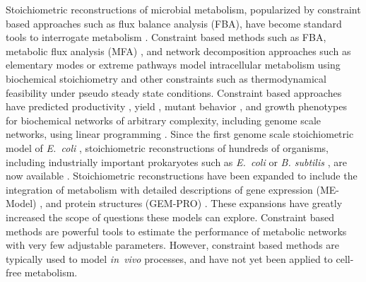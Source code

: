 \documentclass[journal=asbcd6,manuscript=article]{achemso}
\begin{document}
Stoichiometric reconstructions of microbial metabolism, popularized by constraint based approaches such as flux balance analysis (FBA), have become standard tools to interrogate metabolism \cite{2012_lewis_palsson_NatRevMicrobio}.
Constraint based methods such as FBA, metabolic flux analysis (MFA) \cite{WIECHERT2001195}, and network decomposition approaches such as elementary modes \cite{Schuster:2000aa} or extreme pathways \cite{Schilling:2000aa} model intracellular metabolism using biochemical stoichiometry and other constraints such as thermodynamical feasibility \cite{Henry:2007,Hamilton:2013} under pseudo steady state conditions.
Constraint based approaches have predicted productivity \cite{Varma01101994, BTPR:BTPR2132}, yield \cite{Varma01101994}, mutant behavior \cite{Edwards2000}, and growth phenotypes \cite{Brien693} for biochemical networks of arbitrary complexity, including genome scale networks, using linear programming \cite{Covert:2004aa}.
Since the first genome scale stoichiometric model of \textit{E.~coli} \cite{2000_edwards_palsson_PNAS}, stoichiometric reconstructions of hundreds of organisms, including industrially important prokaryotes such as \textit{E.~coli} \cite{Feist:2007aa} or \textit{B. subtilis} \cite{Oh:2007aa}, are now available \cite{2009_feist_palsson_NatRevMicrobio}.
Stoichiometric reconstructions have been expanded to include the integration of metabolism with detailed descriptions of gene expression (ME-Model) \cite{Allen:2003aa, Brien693},
and protein structures (GEM-PRO) \cite{Zhang1544,Chang1220}.
These expansions have greatly increased the scope of questions these models can explore.
Constraint based methods are powerful tools to estimate the performance of metabolic networks with very few adjustable parameters.
However, constraint based methods are typically used to model \textit{in~vivo} processes, and have not yet been applied to cell-free metabolism.
\end{document}
